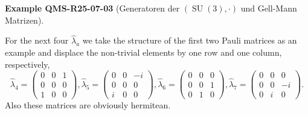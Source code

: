 \documentclass[10pt, letterpaper]{article}
\newcommand{\CustomHeading}[3]{%
  \par\medskip\noindent%
  \textbf{#1 #2} \textnormal{(#3)}.\enskip%
}
\newenvironment{EXA}[2]{\begin{unitbox}\CustomHeading{Example}{#1}{#2}}{\end{unitbox}}
\begin{document}
\begin{EXA}{QMS-R25-07-03}{Generatoren der $(\operatorname{SU}(3), \cdot)$ und Gell-Mann Matrizen}
For the next four $\hat{\lambda}_{a}$ we take the structure of the first two Pauli matrices as an example and displace the non-trivial elements by one row and one column, respectively,
$$
\hat{\lambda}_{4}=\left(\begin{array}{lll}
0 & 0 & 1 \\
0 & 0 & 0 \\
1 & 0 & 0
\end{array}\right), \hat{\lambda}_{5}=\left(\begin{array}{ccc}
0 & 0 & -i \\
0 & 0 & 0 \\
i & 0 & 0
\end{array}\right), \hat{\lambda}_{6}=\left(\begin{array}{lll}
0 & 0 & 0 \\
0 & 0 & 1 \\
0 & 1 & 0
\end{array}\right), \hat{\lambda}_{7}=\left(\begin{array}{ccc}
0 & 0 & 0 \\
0 & 0 & -i \\
0 & i & 0
\end{array}\right) .
$$
Also these matrices are obviously hermitean.


\end{EXA}
\end{document}
